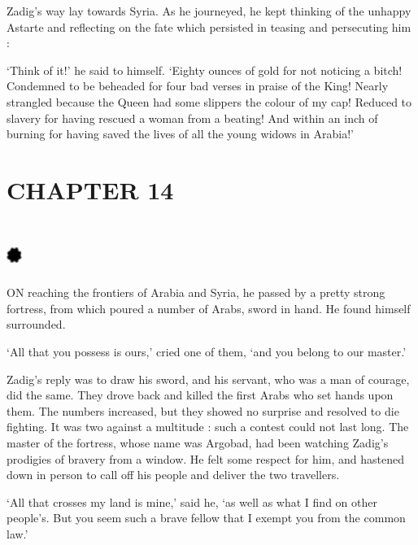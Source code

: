 \documentclass{article}
\begin{document}
\begin{center}
Zadig's way lay towards Syria. As he journeyed, he kept thinking of the unhappy 
Astarte and reflecting on the fate which persisted in teasing and persecuting him 
: 

`Think of it!' he said to himself. `Eighty ounces of gold for not noticing a bitch! 
Condemned to be beheaded for four bad verses in praise of the King! Nearly strangled 
because the Queen had some slippers the colour of my cap! Reduced to slavery for 
having rescued a woman from a beating! And within an inch of burning for having 
saved the lives of all the young widows in Arabia!'\pagebreak{} 

\section*{\textbf{CHAPTER 14 }}

\section*{%
\includegraphics[width=14pt, height=15pt, keepaspectratio=true]{Zadig or L'Ingenu - Voltaire-fig017.jpg}
}

 

ON reaching the frontiers of Arabia and Syria, he passed by a pretty strong fortress, 
from which poured a number of Arabs, sword in hand. He found himself surrounded. 

`All that you possess is ours,' cried one of them, `and you belong to our master.' 

Zadig's reply was to draw his sword, and his servant, who was a man of courage, 
did the same. They drove back and killed the first Arabs who set hands upon them. 
The numbers increased, but they showed no surprise and resolved to die fighting. 
It was two against a multitude : such a contest could not last long. The master 
of the fortress, whose name was Argobad, had been watching Zadig's prodigies of 
bravery from a window. He felt some respect for him, and hastened down in person 
to call off his people and deliver the two travellers. 

`All that crosses my land is mine,' said he, `as well as what I find on other people's. 
But you seem such a brave fellow that I exempt you from the common law.' 


\end{center}
\end{document}
